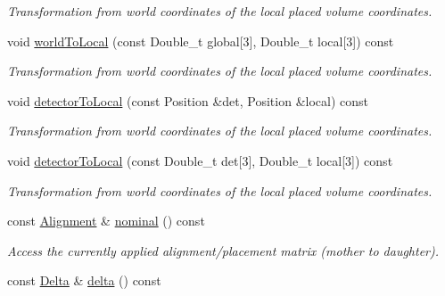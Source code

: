 \begin{DoxyCompactItemize}
\begin{DoxyCompactList}\small\item\em Transformation from world coordinates of the local placed volume coordinates. \item\end{DoxyCompactList}\item 
void \hyperlink{class_d_d4hep_1_1_alignments_1_1_alignment_decorator_a5942ce65c6e2de1dd5d04d297208810f}{worldToLocal} (const Double\_\-t global\mbox{[}3\mbox{]}, Double\_\-t local\mbox{[}3\mbox{]}) const 
\begin{DoxyCompactList}\small\item\em Transformation from world coordinates of the local placed volume coordinates. \item\end{DoxyCompactList}\item 
void \hyperlink{class_d_d4hep_1_1_alignments_1_1_alignment_decorator_a11f53dac579af229135278a74abfd254}{detectorToLocal} (const Position \&det, Position \&local) const 
\begin{DoxyCompactList}\small\item\em Transformation from world coordinates of the local placed volume coordinates. \item\end{DoxyCompactList}\item 
void \hyperlink{class_d_d4hep_1_1_alignments_1_1_alignment_decorator_a98b0305066eca807a95104ad11302e4b}{detectorToLocal} (const Double\_\-t det\mbox{[}3\mbox{]}, Double\_\-t local\mbox{[}3\mbox{]}) const 
\begin{DoxyCompactList}\small\item\em Transformation from world coordinates of the local placed volume coordinates. \item\end{DoxyCompactList}\item 
const \hyperlink{class_d_d4hep_1_1_alignments_1_1_alignment}{Alignment} \& \hyperlink{class_d_d4hep_1_1_alignments_1_1_alignment_decorator_ace3a885d09a36ac499b5261885fc6f9b}{nominal} () const 
\begin{DoxyCompactList}\small\item\em Access the currently applied alignment/placement matrix (mother to daughter). \item\end{DoxyCompactList}\item 
const \hyperlink{class_d_d4hep_1_1_alignments_1_1_delta}{Delta} \& \hyperlink{class_d_d4hep_1_1_alignments_1_1_alignment_decorator_a605b90653ed0edd0bda77c8e63e93e53}{delta} () const 

\end{DoxyCompactItemize}
